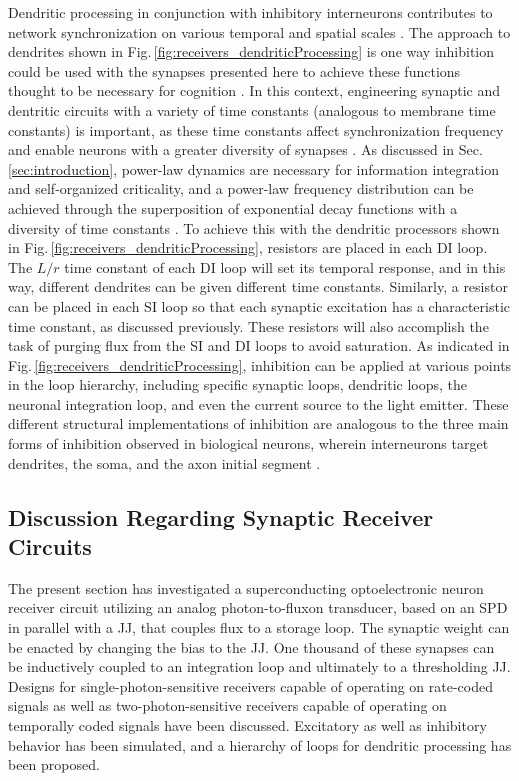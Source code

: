 \documentclass[twocolumn]{article}
\begin{document}
Dendritic processing in conjunction with inhibitory interneurons contributes to network synchronization on various temporal and spatial scales \cite{vala2001,enfr2001,sase2001,bu2006,buwa2012,robu2015}. The approach to dendrites shown in Fig.\,\ref{fig:receivers_dendriticProcessing} is one way inhibition could be used with the synapses presented here to achieve these functions thought to be necessary for cognition \cite{budr2004,fr2015}. In this context, engineering synaptic and dentritic circuits with a variety of time constants (analogous to membrane time constants) is important, as these time constants affect synchronization frequency \cite{lued1997} and enable neurons with a greater diversity of synapses \cite{ma2016}. As discussed in Sec.\,\ref{sec:introduction}, power-law dynamics are necessary for information integration and self-organized criticality, and a power-law frequency distribution can be achieved through the superposition of exponential decay functions with a diversity of time constants \cite{be2007}. To achieve this with the dendritic processors shown in Fig.\,\ref{fig:receivers_dendriticProcessing}, resistors are placed in each DI loop. The $L/r$ time constant of each DI loop will set its temporal response, and in this way, different dendrites can be given different time constants. Similarly, a resistor can be placed in each SI loop so that each synaptic excitation has a characteristic time constant, as discussed previously. These resistors will also accomplish the task of purging flux from the SI and DI loops to avoid saturation. As indicated in Fig.\,\ref{fig:receivers_dendriticProcessing}, inhibition can be applied at various points in the loop hierarchy, including specific synaptic loops, dendritic loops, the neuronal integration loop, and even the current source to the light emitter. These different structural implementations of inhibition are analogous to the three main forms of inhibition observed in biological neurons, wherein interneurons target dendrites, the soma, and the axon initial segment \cite{robu2015}. 
	
\subsection{\label{sec:discussion_receiverCircuits}Discussion Regarding Synaptic Receiver Circuits}
The present section has investigated a superconducting optoelectronic neuron receiver circuit utilizing an analog photon-to-fluxon transducer, based on an SPD in parallel with a JJ, that couples flux to a storage loop. The synaptic weight can be enacted by changing the bias to the JJ. One thousand of these synapses can be inductively coupled to an integration loop and ultimately to a thresholding JJ. Designs for single-photon-sensitive receivers capable of operating on rate-coded signals as well as two-photon-sensitive receivers capable of operating on temporally coded signals have been discussed. Excitatory as well as inhibitory behavior has been simulated, and a hierarchy of loops for dendritic processing has been proposed.
\end{document}
